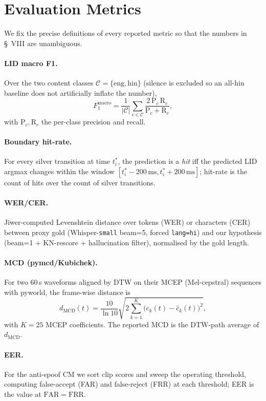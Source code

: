 \documentclass[conference]{IEEEtran}
\begin{document}
\section{Evaluation Metrics}

We fix the precise definitions of every reported metric so that the
numbers in \S~VIII are unambiguous.

\paragraph*{LID macro F1.} Over the two content classes
$\mathcal{C}=\{\mathrm{eng,hin}\}$ (silence is excluded so an all-hin
baseline does not artificially inflate the number),
\[
F_1^{\text{macro}} = \frac{1}{|\mathcal{C}|}\sum_{c\in\mathcal{C}}
    \frac{2\,\mathrm{P}_c\,\mathrm{R}_c}{\mathrm{P}_c+\mathrm{R}_c},
\]
with $\mathrm{P}_c, \mathrm{R}_c$ the per-class precision and recall.

\paragraph*{Boundary hit-rate.} For every silver transition at time
$t^{*}_i$, the prediction is a \emph{hit} iff the predicted LID
argmax changes within the window $[t^{*}_i-200\,\text{ms},
t^{*}_i+200\,\text{ms}]$; hit-rate is the count of hits over the
count of silver transitions.

\paragraph*{WER/CER.} Jiwer-computed Levenshtein distance over tokens
(WER) or characters (CER) between proxy gold (Whisper-\texttt{small}
beam=5, forced \texttt{lang=hi}) and our hypothesis (beam=1
+ KN-rescore + hallucination filter), normalised by the gold length.

\paragraph*{MCD (pymcd/Kubichek).} For two 60\,s waveforms aligned by
DTW on their MCEP (Mel-cepstral) sequences with pyworld, the
frame-wise distance is
\[
d_{\text{MCD}}(t) = \frac{10}{\ln 10}\sqrt{2\sum_{k=1}^{K}\big(c_k(t) - \hat{c}_k(t)\big)^2},
\]
with $K=25$ MCEP coefficients. The reported MCD is the DTW-path average
of $d_{\text{MCD}}$.

\paragraph*{EER.} For the anti-spoof CM we sort clip scores and sweep
the operating threshold, computing false-accept (FAR) and false-reject
(FRR) at each threshold; EER is the value at $\mathrm{FAR}=\mathrm{FRR}$.
\end{document}
